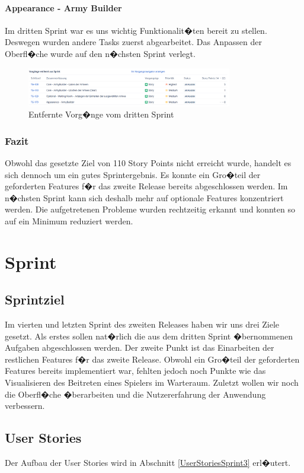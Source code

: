 \documentclass[12pt, titlepage]{scrartcl}
\newcommand{\RN}[1]{%
	\textup{\uppercase\expandafter{\romannumeral#1}}%
}
\begin{document}
			\paragraph{Appearance - Army Builder} Im dritten Sprint war es uns wichtig Funktionalit�ten bereit zu stellen. Deswegen wurden andere Tasks zuerst abgearbeitet. Das Anpassen der Oberfl�che wurde auf den n�chsten Sprint verlegt.
			\begin{figure}[H] 
				\centering
				\includegraphics[width=0.8\textwidth]{Aus_dem_Sprint_Entfernte_Vorgaenge_Sprint_3.PNG}
				\caption{Entfernte Vorg�nge vom dritten Sprint}
				\label{EntfernteVorgaengeSprint3}
			\end{figure}
		
		\subsubsection{Fazit}
		Obwohl das gesetzte Ziel von 110 Story Points nicht erreicht wurde, handelt es sich dennoch um ein gutes Sprintergebnis. Es konnte ein Gro�teil der geforderten Features f�r das zweite Release bereits abgeschlossen werden. Im n�chsten Sprint kann sich deshalb mehr auf optionale Features konzentriert werden. Die aufgetretenen Probleme wurden rechtzeitig erkannt und konnten so auf ein Minimum reduziert werden. 
		
	\section{Sprint \RN{4}}
		\subsection{Sprintziel}
			Im vierten und letzten Sprint des zweiten Releases haben wir uns drei Ziele gesetzt. Als erstes sollen nat�rlich die aus dem dritten Sprint �bernommenen Aufgaben abgeschlossen werden. Der zweite Punkt ist das Einarbeiten der restlichen Features f�r das zweite Release. Obwohl ein Gro�teil der geforderten Features bereits implementiert war, fehlten jedoch noch Punkte wie das Visualisieren des Beitreten eines Spielers im Warteraum. Zuletzt wollen wir noch die Oberfl�che �berarbeiten und die Nutzererfahrung der Anwendung verbessern.
		
		\subsection{User Stories}
			Der Aufbau der User Stories wird in Abschnitt \ref{UserStoriesSprint3} erl�utert.
			
\end{document}
